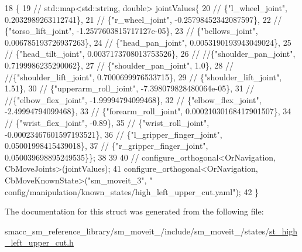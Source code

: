 \begin{DoxyCode}
18     \{
19         \textcolor{comment}{// std::map<std::string, double> jointValues\{}
20         \textcolor{comment}{//     \{"l\_wheel\_joint", 0.2032989263112741\},}
21         \textcolor{comment}{//     \{"r\_wheel\_joint", -0.25798452342087597\},}
22         \textcolor{comment}{//     \{"torso\_lift\_joint", -1.2577603815717127e-05\},}
23         \textcolor{comment}{//     \{"bellows\_joint", 0.006785193726937263\},}
24         \textcolor{comment}{//     \{"head\_pan\_joint", 0.0053190193943049024\},}
25         \textcolor{comment}{//     \{"head\_tilt\_joint", 0.0037173708013753526\},}
26         \textcolor{comment}{//     //\{"shoulder\_pan\_joint", 0.7199986235290062\},}
27         \textcolor{comment}{//     \{"shoulder\_pan\_joint", 1.0\},}
28         \textcolor{comment}{//     //\{"shoulder\_lift\_joint", 0.7000699976533715\},}
29         \textcolor{comment}{//     \{"shoulder\_lift\_joint", 1.51\},}
30         \textcolor{comment}{//     \{"upperarm\_roll\_joint", -7.398079828480064e-05\},}
31         \textcolor{comment}{//     //\{"elbow\_flex\_joint", -1.99994794099468\},}
32         \textcolor{comment}{//     \{"elbow\_flex\_joint", -2.49994794099468\},}
33         \textcolor{comment}{//     \{"forearm\_roll\_joint", 0.00021030168417901507\},}
34         \textcolor{comment}{//     \{"wrist\_flex\_joint", -0.89\},}
35         \textcolor{comment}{//     \{"wrist\_roll\_joint", -0.00023467601597193521\},}
36         \textcolor{comment}{//     \{"l\_gripper\_finger\_joint", 0.05001998415439018\},}
37         \textcolor{comment}{//     \{"r\_gripper\_finger\_joint", 0.050039698895249535\}\};}
38 
39 
40 \textcolor{comment}{//        configure\_orthogonal<OrNavigation, CbMoveJoints>(jointValues);}
41         configure\_orthogonal<OrNavigation, CbMoveKnownState>(\textcolor{stringliteral}{"sm\_moveit\_3"}, \textcolor{stringliteral}{"
      config/manipulation/known\_states/high\_left\_upper\_cut.yaml"});
42     \}
\end{DoxyCode}


The documentation for this struct was generated from the following file\+:\begin{DoxyCompactItemize}
\item 
smacc\+\_\+sm\+\_\+reference\+\_\+library/sm\+\_\+moveit\+\_/include/sm\+\_\+moveit\+\_/states/\hyperlink{st__high__left__upper__cut_8h}{st\+\_\+high\+\_\+left\+\_\+upper\+\_\+cut.\+h}\end{DoxyCompactItemize}
